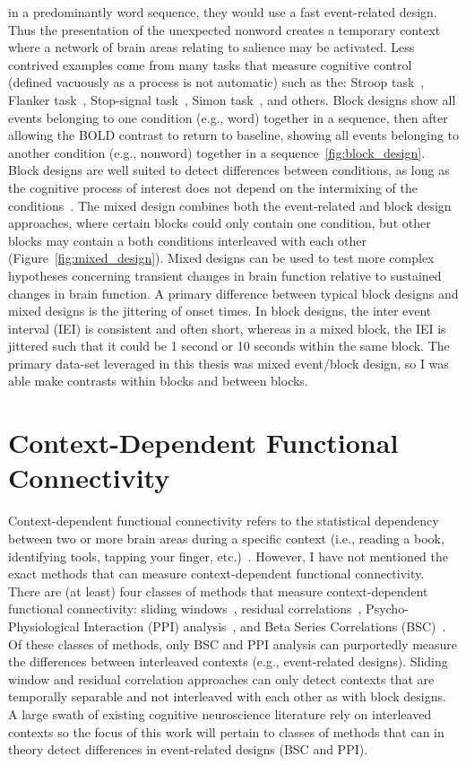 \documentclass[phd,figures,tables,ackpage,abstractpage,publicabstractpage]{uithesis}
\begin{document}
in a predominantly word sequence, they would use a fast event-related design.
Thus the presentation of the unexpected nonword creates a temporary context where a network of brain areas relating
to salience may be activated.
Less contrived examples come from many tasks that measure cognitive control (defined vacuously
as a process is not automatic) such as the: Stroop task~\cite{Stroop1935},
Flanker task~\cite{Eriksen1974a}, Stop-signal task~\cite{Logan1982},
Simon task~\cite{Simon1963}, and others.
Block designs show all events belonging to one condition (e.g., word) together in a sequence,
then after allowing the BOLD contrast to return to baseline, showing all events belonging
to another condition (e.g., nonword) together in a sequence~\ref{fig:block_design}.
Block designs are well suited to detect differences between conditions, as long as the cognitive process of interest
does not depend on the intermixing of the conditions~\cite{Friston1999}.
The mixed design combines both the event-related and block design approaches, where certain blocks
could only contain one condition, but
other blocks may contain a both conditions interleaved with each other (Figure~\ref{fig:mixed_design}).
Mixed designs can be used to test more complex hypotheses concerning transient changes in brain function
relative to sustained changes in brain function.
A primary difference between typical block designs and mixed designs is the jittering of onset times.
In block designs, the inter event interval (IEI) is consistent and often short, whereas
in a mixed block, the IEI is jittered such that it could be 1 second or 10 seconds within the same block.
The primary data-set leveraged in this thesis was mixed event/block design, so I was
able make contrasts within blocks and between blocks.

\section{Context-Dependent Functional Connectivity}

Context-dependent functional connectivity refers to the 
statistical dependency between two or more brain areas during a specific context
(i.e., reading a book, identifying tools, tapping your finger, etc.)~\cite{Friston1997}.
However, I have not mentioned the exact methods that can measure context-dependent functional connectivity.
There are (at least) four classes of methods that measure context-dependent functional connectivity:
sliding windows~\cite{Shine2015}, residual correlations~\cite{Cole2014a},
Psycho-Physiological Interaction (PPI)
analysis~\cite{Friston1997}, and Beta Series Correlations (BSC)~\cite{Rissman2004}.
Of these classes of methods, only BSC and PPI analysis can purportedly measure the differences
between interleaved contexts (e.g., event-related designs).
Sliding window and residual correlation approaches can only detect contexts that are
temporally separable and not interleaved with each other as with block designs.
A large swath of existing cognitive neuroscience literature rely on interleaved
contexts so the focus of this work will pertain to classes of methods
that can in theory detect differences in event-related designs (BSC and PPI).
\end{document}
